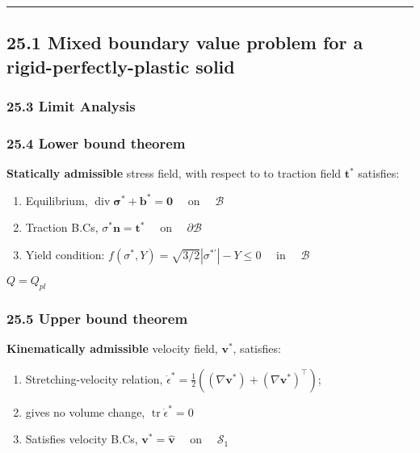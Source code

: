 \begin{center}\rule{0.5\linewidth}{0.5pt}\end{center}

\hypertarget{mixed-boundary-value-problem-for-a-rigid-perfectly-plastic-solid}{%
\subsection{25.1 Mixed boundary value problem for a
rigid-perfectly-plastic
solid}\label{mixed-boundary-value-problem-for-a-rigid-perfectly-plastic-solid}}

\hypertarget{limit-analysis}{%
\subsubsection{25.3 Limit Analysis}\label{limit-analysis}}

\hypertarget{lower-bound-theorem}{%
\subsubsection{25.4 Lower bound theorem}\label{lower-bound-theorem}}

\textbf{Statically admissible} stress field, with respect to to traction
field \(\mathbf{t}^{*}\) satisfies:

\begin{enumerate}
\def\labelenumi{\arabic{enumi}.}
\item
  Equilibrium,
  \(\operatorname{div} \boldsymbol{\sigma}^{*}+\mathbf{b}^{*}=\mathbf{0} \quad\)
  on \(\quad \mathcal{B}\)
\item
  Traction B.Cs, \(\sigma^{*} \mathbf{n}=\mathbf{t}^{*} \quad\) on
  \(\quad \partial \mathcal{B}\)
\item
  Yield condition:
  \(f\left(\sigma^{*}, Y\right)=\sqrt{3 / 2}\left|\sigma^{* \prime}\right|-Y \leq 0 \quad\)
  in \(\quad \mathcal{B}\)
\end{enumerate}

\(Q = Q_{pl}\)

\hypertarget{upper-bound-theorem}{%
\subsubsection{25.5 Upper bound theorem}\label{upper-bound-theorem}}

\textbf{Kinematically admissible} velocity field, \(\mathbf{v}^{*}\),
satisfies:

\begin{enumerate}
\def\labelenumi{\arabic{enumi}.}
\item
  Stretching-velocity relation,
  \(\dot{\epsilon}^{*}=\frac{1}{2}\left(\left(\nabla \mathbf{v}^{*}\right)+\left(\nabla \mathbf{v}^{*}\right)^{\top}\right)\);
\item
  gives no volume change, \(\operatorname{tr} \dot{\epsilon}^{*}=0\)
\item
  Satisfies velocity B.Cs, \(\mathbf{v}^{*}=\hat{\mathbf{v}} \quad\) on
  \(\quad \mathcal{S}_{1}\)
\end{enumerate}

